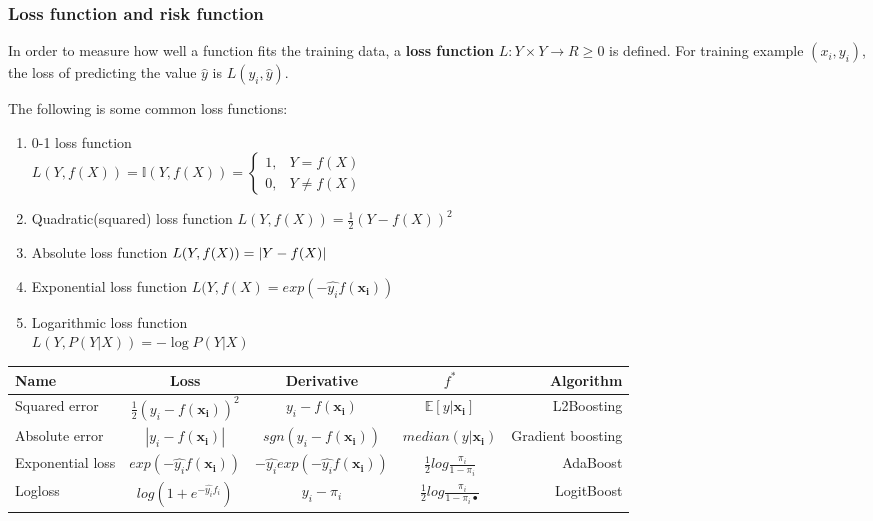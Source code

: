 \subsubsection{Loss function and risk function}
\label{sec:Loss-function-and-risk-function}

\begin{definition}
In order to measure how well a function fits the training data, a \textbf{loss function} $L:Y \times Y \rightarrow R \geq 0$ is defined. For training example $(x_i,y_i)$, the loss of predicting the value $\widehat{y}$ is $L(y_i,\widehat{y})$.
\end{definition}

The following is some common loss functions:
\begin{enumerate}
\item 0-1 loss function \\ $L(Y,f(X))=\mathbb{I}(Y,f(X))=\begin{cases} 1, & Y=f(X) \\ 0, & Y \neq f(X) \end{cases}$
\item Quadratic(squared) loss function $L(Y,f(X))=\frac{1}{2}\left(Y-f(X)\right)^2$
\item Absolute loss function $L(Y,f(X))=\left\lvert Y-f(X)\right\rvert$
\item Exponential loss function $L(Y,f(X)=exp(-\hat{y_i}f(\mathbf{x_i}))$ 
\item Logarithmic loss function \\ $L(Y,P(Y|X))=-\log{P(Y|X)}$
\end{enumerate}

\begin{tabular}{l*{3}{c}r}
Name & Loss & Derivative & $f^*$ & Algorithm                                                                                 \\
\hline
Squared error & $\frac{1}{2}(y_i-f(\mathbf{x_i}))^2$ & $y_i - f(\mathbf{x_i})$ & $\mathbb{E}[y|\mathbf{x_i}]$ & L2Boosting \\
Absolute error & $|y_i-f(\mathbf{x_i})|$ & $sgn(y_i-f(\mathbf{x_i}))$ & $median(y|\mathbf{x_i})$ & Gradient boosting \\
Exponential loss & $exp(-\hat{y_i}f(\mathbf{x_i}))$ & $-\hat{y_i}exp(-\hat{y_i}f(\mathbf{x_i}))$ & $\frac{1}{2}log\frac{\pi_i}{1-\pi_i}$ & AdaBoost \\
Logloss & $log(1+e^{-\hat{y_i}f_i})$ & $y_i-\pi_i$ & $\frac{1}{2}log\frac{\pi_i}{1-\pi_i•}$ & LogitBoost \\
\hline
\end{tabular}

